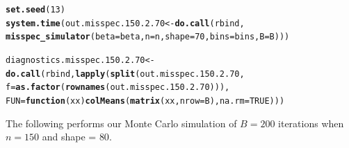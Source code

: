 \documentclass[11pt]{article}\usepackage[]{graphicx}\usepackage[]{color}
\makeatletter
\newcommand{\hlnum}[1]{\textcolor[rgb]{0.686,0.059,0.569}{#1}}%
\newcommand{\hlstd}[1]{\textcolor[rgb]{0.345,0.345,0.345}{#1}}%
\newcommand{\hlkwa}[1]{\textcolor[rgb]{0.161,0.373,0.58}{\textbf{#1}}}%
\newcommand{\hlkwb}[1]{\textcolor[rgb]{0.69,0.353,0.396}{#1}}%
\newcommand{\hlkwc}[1]{\textcolor[rgb]{0.333,0.667,0.333}{#1}}%
\newcommand{\hlkwd}[1]{\textcolor[rgb]{0.737,0.353,0.396}{\textbf{#1}}}%
\newenvironment{kframe}{%
 \def\at@end@of@kframe{}%
 \ifinner\ifhmode%
  \def\at@end@of@kframe{\end{minipage}}%
  \begin{minipage}{\columnwidth}%
 \fi\fi%
 \def\FrameCommand##1{\hskip\@totalleftmargin \hskip-\fboxsep
 \colorbox{shadecolor}{##1}\hskip-\fboxsep
     \hskip-\linewidth \hskip-\@totalleftmargin \hskip\columnwidth}%
 \MakeFramed {\advance\hsize-\width
   \@totalleftmargin\z@ \linewidth\hsize
   \@setminipage}}%
 {\par\unskip\endMakeFramed%
 \at@end@of@kframe}
\newenvironment{knitrout}{}{} %
\makeatother
\begin{document}
\begin{knitrout}
\color{fgcolor}\begin{kframe}
\begin{alltt}
\hlkwd{set.seed}\hlstd{(}\hlnum{13}\hlstd{)}
\hlkwd{system.time}\hlstd{(out.misspec.150.2.70} \hlkwb{<-} \hlkwd{do.call}\hlstd{(rbind,}
  \hlkwd{misspec_simulator}\hlstd{(}\hlkwc{beta} \hlstd{= beta,} \hlkwc{n} \hlstd{= n,} \hlkwc{shape} \hlstd{=} \hlnum{70}\hlstd{,} \hlkwc{bins} \hlstd{= bins,} \hlkwc{B} \hlstd{= B)))}
\end{alltt}


{\ttfamily\noindent\bfseries\color{errorcolor}{\#\# Error in chol.default(crossprod(x) + lambda[j] * diag(v)): the leading minor of order 5 is not positive definite}}

{\ttfamily\noindent\itshape\color{messagecolor}{\#\# Timing stopped at: 0.702 0 0.702}}\begin{alltt}
\hlstd{diagnostics.misspec.150.2.70} \hlkwb{<-} \hlkwd{do.call}\hlstd{(rbind,} \hlkwd{lapply}\hlstd{(}\hlkwd{split}\hlstd{(out.misspec.150.2.70,}
  \hlkwc{f} \hlstd{=} \hlkwd{as.factor}\hlstd{(}\hlkwd{rownames}\hlstd{(out.misspec.150.2.70))),}
  \hlkwc{FUN} \hlstd{=} \hlkwa{function}\hlstd{(}\hlkwc{xx}\hlstd{)} \hlkwd{colMeans}\hlstd{(}\hlkwd{matrix}\hlstd{(xx,} \hlkwc{nrow} \hlstd{= B),} \hlkwc{na.rm} \hlstd{=} \hlnum{TRUE}\hlstd{)))}
\end{alltt}


{\ttfamily\noindent\bfseries\color{errorcolor}{\#\# Error in split(out.misspec.150.2.70, f = as.factor(rownames(out.misspec.150.2.70))): object 'out.misspec.150.2.70' not found}}\end{kframe}
\end{knitrout}


The following performs our Monte Carlo simulation of $B = 200$ iterations 
when $n = 150$ and shape = $80$.
\end{document}

